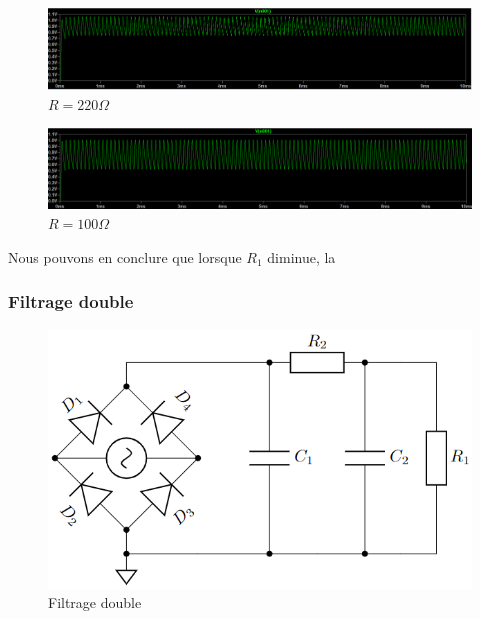 \begin{figure}[H]
    \begin{center}
    \includegraphics[scale=0.25]{images/LTSPICE/7.png}
    \caption{$R=220\Omega$}
    \end{center}
\end{figure}

\begin{figure}[H]
    \begin{center}
    \includegraphics[scale=0.25]{images/LTSPICE/8.png}
    \caption{$R=100\Omega$}
    \end{center}
\end{figure}

Nous pouvons en conclure que lorsque $R_1$ diminue, la 


\subsubsection{Filtrage double}

\begin{figure}[H]
    \begin{center}
    \includegraphics[scale=0.5]{images/6.png}
    \caption{Filtrage double}
    \end{center}
\end{figure}


